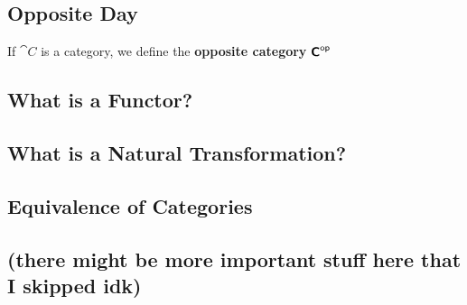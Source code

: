 \subsection{Opposite Day}
\begin{definition}
  If $\cat C$ is a category, we define the \textbf{opposite category} ${\bm{\mathsf{C}}}^{\mathsf{op}}$
\end{definition}


\subsection{What is a Functor?}

\subsection{What is a Natural Transformation?}

\subsection{Equivalence of Categories}

\subsection{(there might be more important stuff here that I skipped idk)}